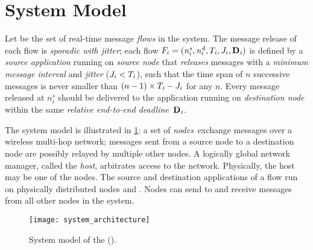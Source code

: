 
\section{System Model}
\label{sec:problem}

Let \flowset be the set of real-time message \emph{flows} in the system.
The message release of each flow is \emph{sporadic with jitter}; \ie each flow $F_{i} = (\mathit{n^s_{i}},\mathit{n^d_{i}},T_{\mathit{i}},J_{i},\mathbf{D}_{\mathit{i}})$ is defined by a \emph{source application} running on \emph{source node} \flowsrci that \emph{releases} messages with a \emph{minimum message interval} \periodi and \emph{jitter} \jitteri ($J_{i} < T_{\mathit{i}}$), such that the time span of $n$ successive messages is never smaller than $(n-1)\times T_{\mathit{i}} - J_{i}$ for any $n$. Every message released at $n_i^s$ should be delivered to the application running on \emph{destination node} \flowdsti within the  same \emph{relative end-to-end deadline}~$\mathbf{D}_{\mathit{i}}$.


The system model is illustrated in \cref{fig:DRP_sysmodel}: a set of \emph{nodes}~\nodeset exchange messages over a wireless multi-hop network; messages sent from a source node to a destination node are possibly relayed by multiple other nodes.
A logically global network manager, called the \emph{host}, arbitrates access to the network. Physically, the host may be one of the nodes.
The source and destination applications of a flow \flowi run on physically distributed nodes \flowsrci and \flowdsti.
Nodes can send to and receive messages from all other nodes in the system.

\begin{figure}
  \centering
  \texttt{[image: system\_architecture]}
  \caption{System model of the \DRPLong (\DRP).
  }
  \label{fig:DRP_sysmodel}
\end{figure}

